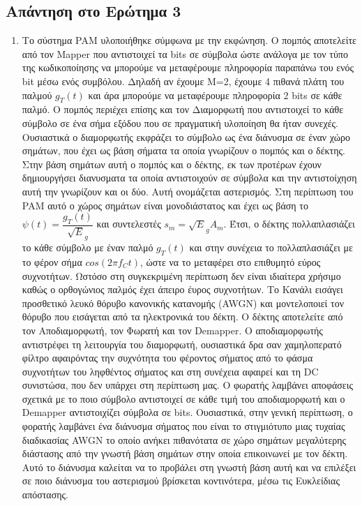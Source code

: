 \documentclass{article}
\begin{document}
\subsection*{Απάντηση στο Ερώτημα 3}
    \begin{enumerate}
    \item
    Το σύστημα PAM υλοποιήθηκε σύμφωνα με την εκφώνηση. Ο πομπός αποτελείτε από τον Mapper που αντιστοιχεί τα bits σε σύμβολα ώστε ανάλογα με τον τύπο της κωδικοποίησης να μπορούμε να μεταφέρουμε πληροφορία παραπάνω του ενός bit μέσω ενός συμβόλου. Δηλαδή αν έχουμε M=2, έχουμε 4 πιθανά πλάτη του παλμού $g_T(t)$ και άρα μπορούμε να μεταφέρουμε πληροφορία 2 bits σε κάθε παλμό. Ο πομπός περιέχει επίσης και τον Διαμορφωτή που αντιστοιχεί το κάθε σύμβολο σε ένα σήμα εξόδου που σε πραγματική υλοποίηση θα ήταν συνεχές. Ουσιαστικά ο διαμορφωτής εκφράζει το σύμβολο ως ένα διάνυσμα σε έναν χώρο σημάτων, που έχει ως βάση σήματα τα οποία γνωρίζουν ο πομπός  και ο δέκτης. Στην βάση σημάτων αυτή ο πομπός και ο δέκτης, εκ των προτέρων έχουν δημιουργήσει διανυσματα τα οποία αντιστοιχούν σε σύμβολα και την αντιστοίχηση αυτή την γνωρίζουν και οι δύο. Αυτή ονομάζεται αστερισμός. Στη περίπτωση του PAM αυτό ο χώρος σημάτων είναι μονοδιάστατος και έχει ως βάση το $\psi(t) = \dfrac{g_T(t)}{\sqrt E_g}$ και συντελεστές $s_m = \sqrt E_g A_m$. Έτσι, ο δέκτης πολλαπλασιάζει το κάθε σύμβολο με έναν παλμό $g_T(t)$ και στην συνέχεια το πολλαπλασιάζει με το φέρον σήμα $cos(2\pi f_C t)$, ώστε να το μεταφέρει στο επιθυμητό εύρος συχνοτήτων. Ωστόσο στη συγκεκριμένη περίπτωση δεν είναι ιδιαίτερα χρήσιμο καθώς ο ορθογώνιος παλμός έχει άπειρο έυρος συχνοτήτων. Το Κανάλι εισάγει προσθετικό λευκό θόρυβο κανονικής κατανομής (AWGN) και μοντελοποιεί τον θόρυβο που εισάγεται από τα ηλεκτρονικά του δέκτη. Ο δέκτης αποτελείτε από τον Αποδιαμορφωτή, τον Φωρατή και τον Demapper. O αποδιαμορφωτής αντιστρέφει τη λειτουργία του διαμορφωτή, ουσιαστικά δρα σαν χαμηλοπερατό φίλτρο αφαιρόντας την συχνότητα του φέροντος σήματος από το φάσμα συχνοτήτων του ληφθέντος σήματος και στη συνέχεια αφαιρεί και τη DC συνιστώσα, που δεν υπάρχει στη περίπτωση μας. Ο φωρατής λαμβάνει αποφάσεις σχετικά με το ποιο σύμβολο αντιστοιχεί σε κάθε τιμή του αποδιαμορφωτή και ο Demapper αντιστοιχίζει σύμβολα σε bits. Ουσιαστικά, στην γενική περίπτωση, ο φορατής λαμβάνει ένα διάνυσμα σήματος που είναι το στιγμιότυπο μιας τυχαίας διαδικασίας AWGN το οποίο ανήκει πιθανότατα σε χώρο σημάτων μεγαλύτερης διάστασης από την γνωστή βάση σημάτων στην οποία επικοινωνεί με τον δέκτη. Αυτό το διάνυσμα καλείται να το προβάλει στη γνωστή βάση αυτή και να επιλέξει σε ποιο διάνυσμα του αστερισμού βρίσκεται κοντινότερα, μέσω τις Ευκλείδιας απόστασης.
    

\end{enumerate}
\end{document}
